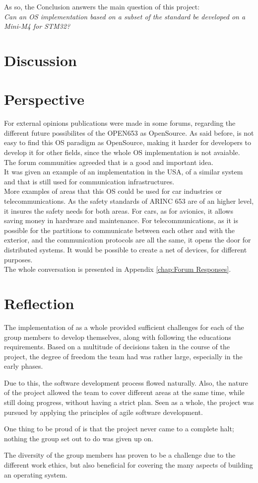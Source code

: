 As so, the Conclusion answers the main question of this project:\\
\textit{Can an OS implementation based on a subset of the \arinc{} standard be
developed on a Mini-M4 for STM32?}
\clearpage

\section{Discussion}

\section{Perspective}
For external opinions publications were made in some forums, regarding the different future possibilites of the OPEN653 as OpenSource. As said before, is not easy to find this OS paradigm as OpenSource, making it harder for developers to develop it for other fields, since the whole OS implementation is not avaiable. The forum communities agreeded that is a good and important idea.\\
It was given an example of an implementation in the USA, of a similar system and that is still used for
communication infrastructures.\\
More examples of areas that this OS could be used for car industries or telecommunications.
As the safety standards of ARINC 653 are of an higher level, it insures the safety needs for both areas. For cars, as for avionics, it allows saving money in hardware and maintenance. For telecommunications, as it is possible for the partitions to communicate between each other and with the exterior, and the communication protocols are all the same, it opens the door for distributed systems. It would be possible to create a net of devices, for different purposes.\\
The whole conversation is presented in Appendix \ref{chap:Forum Responses}.

\section{Reflection}
The implementation of \OSname{} as a whole provided sufficient challenges
for each of the group members to develop themselves, along with following
the education\textquotesingle s requirements.
Based on a multitude of decisions taken in the course of the project,
the degree of freedom the team had was rather large,
especially in the early phases.

Due to this, the software development process flowed naturally. 
Also, the nature of the project
allowed the team to cover different areas at the same time, while still
doing progress, without having a strict plan. Seen as a whole, the project
was pursued by applying the principles of agile software development.

One thing to be proud of is that the project never came to a complete halt;
nothing the group set out to do was given up on.

The diversity of the group members has proven to be a challenge due to the different work ethics,
but also beneficial for covering the many aspects of building an operating system.
